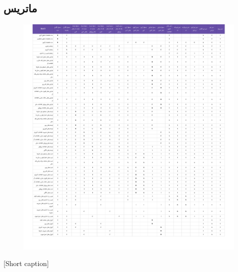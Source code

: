 \subsection{
ماتریس
}

\begin{center}
  \begin{figure} [H]
    { \includegraphics[width=\textwidth]{appandecies/RACI.pdf}}
  \end{figure}
  [Short caption]{}
\end{center}

